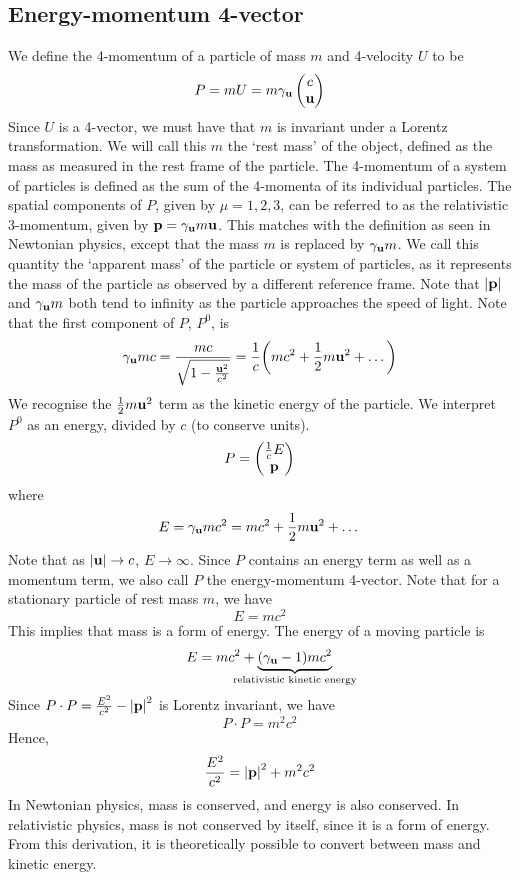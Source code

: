 \subsection{Energy-momentum 4-vector}
We define the 4-momentum of a particle of mass \(m\) and 4-velocity \(U\) to be
\[
	P = mU = m\gamma_{\vb u} \begin{pmatrix}
		c \\ \vb u
	\end{pmatrix}
\]
Since \(U\) is a 4-vector, we must have that \(m\) is invariant under a Lorentz transformation.
We will call this \(m\) the `rest mass' of the object, defined as the mass as measured in the rest frame of the particle.
The 4-momentum of a system of particles is defined as the sum of the 4-momenta of its individual particles.
The spatial components of \(P\), given by \(\mu = 1, 2, 3\), can be referred to as the relativistic 3-momentum, given by \(\vb p = \gamma_{\vb u} m \vb u\).
This matches with the definition as seen in Newtonian physics, except that the mass \(m\) is replaced by \(\gamma_{\vb u} m\).
We call this quantity the `apparent mass' of the particle or system of particles, as it represents the mass of the particle as observed by a different reference frame.
Note that \(\abs{\vb p}\) and \(\gamma_{\vb u} m\) both tend to infinity as the particle approaches the speed of light.
Note that the first component of \(P\), \(P^0\), is
\[
	\gamma_{\vb u} mc = \frac{mc}{\sqrt{1 - \frac{\vb u^2}{c^2}}} = \frac{1}{c}\qty(mc^2 + \frac{1}{2}m\vb u^2 + \dots)
\]
We recognise the \(\frac{1}{2}m\vb u^2\) term as the kinetic energy of the particle.
We interpret \(P^0\) as an energy, divided by \(c\) (to conserve units).
\[
	P = \begin{pmatrix}
		\frac{1}{c} E \\ \vb p
	\end{pmatrix}
\]
where
\[
	E = \gamma_{\vb u} mc^2 = mc^2 + \frac{1}{2}m\vb u^2 + \dots
\]
Note that as \(\abs{\vb u} \to c\), \(E \to \infty\).
Since \(P\) contains an energy term as well as a momentum term, we also call \(P\) the energy-momentum 4-vector.
Note that for a stationary particle of rest mass \(m\), we have
\[
	E = mc^2
\]
This implies that mass is a form of energy.
The energy of a moving particle is
\[
	E = mc^2 + \underbrace{(\gamma_{\vb u} - 1)mc^2}_{\mathclap{\text{relativistic kinetic energy}}}
\]
Since \(P \cdot P = \frac{E^2}{c^2} - \abs{\vb p}^2\) is Lorentz invariant, we have
\[
	P \cdot P = m^2c^2
\]
Hence,
\[
	\frac{E^2}{c^2} = \abs{\vb p}^2 + m^2c^2
\]
In Newtonian physics, mass is conserved, and energy is also conserved.
In relativistic physics, mass is not conserved by itself, since it is a form of energy.
From this derivation, it is theoretically possible to convert between mass and kinetic energy.

